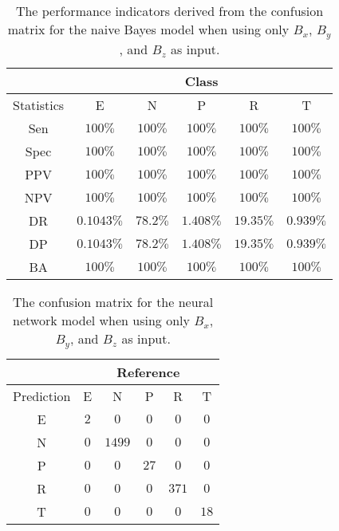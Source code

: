 \begin{table}[!ht]
	\centering
	\begin{tabular}{|c|c|c|c|c|c|}
		\hline
		 & \multicolumn{5}{c|}{Class} \\ \hline
		Statistics & E & N & P & R & T \\ \hline
		Sen & $100\%$ & $100\%$ & $100\%$ & $100\%$ & $100\%$ \\ \hline
		Spec & $100\%$ & $100\%$ & $100\%$ & $100\%$ & $100\%$ \\ \hline
		PPV & $100\%$ & $100\%$ & $100\%$ & $100\%$ & $100\%$ \\ \hline
		NPV & $100\%$ & $100\%$ & $100\%$ & $100\%$ & $100\%$ \\ \hline
		DR & $0.1043\%$ & $78.2\%$ & $1.408\%$ & $19.35\%$ & $0.939\%$ \\ \hline
		DP & $0.1043\%$ & $78.2\%$ & $1.408\%$ & $19.35\%$ & $0.939\%$ \\ \hline
		BA & $100\%$ & $100\%$ & $100\%$ & $100\%$ & $100\%$ \\ \hline
	\end{tabular}
	\caption{The performance indicators derived from the confusion matrix for the naive Bayes model when using only $B_{x}$, $B_{y}$, and $B_{z}$ as input.}
	\label{tab:cs:reverse:coord:nb}
\end{table}

\begin{table}[!ht]
	\centering
	\begin{tabular}{|c|c|c|c|c|c|}
		\hline
		 & \multicolumn{5}{|c|}{Reference} \\ \hline
		 Prediction & E & N & P & R & T \\ \hline
		 E & $2$ & $0$ & $0$ & $0$ & $0$ \\ \hline
		 N & $0$ & $1499$ & $0$ & $0$ & $0$ \\ \hline
		 P & $0$ & $0$ & $27$ & $0$ & $0$ \\ \hline
		 R & $0$ & $0$ & $0$ & $371$ & $0$ \\ \hline
		 T & $0$ & $0$ & $0$ & $0$ & $18$ \\ \hline
	\end{tabular}
	\caption{The confusion matrix for the neural network model when using only $B_{x}$, $B_{y}$, and $B_{z}$ as input.}
	\label{tab:cm:coord:nnet}
\end{table}


